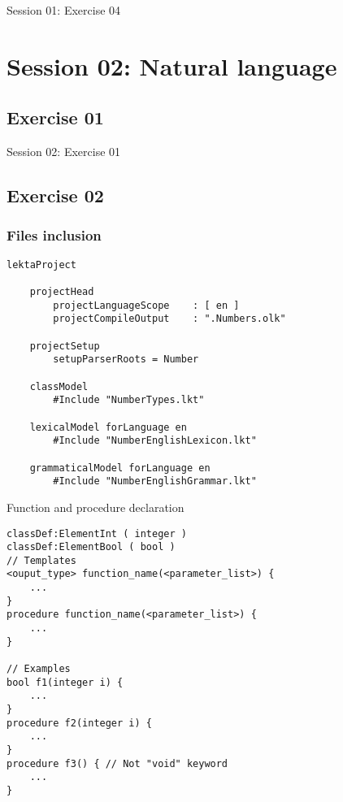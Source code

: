 \documentclass[11pt]{beamer}
\begin{document}
\begin{frame}[fragile]
\Huge
\begin{center}
Session 01: Exercise 04
\end{center}
\end{frame}

\section{Session 02: Natural language}

\subsection{Exercise 01}

\begin{frame}[fragile]
\Huge
\begin{center}
Session 02: Exercise 01
\end{center}
\end{frame}

\subsection{Exercise 02}

\begin{frame}[fragile]
\frametitle{Files inclusion}
\footnotesize
\begin{lstlisting}[language=lekta]
lektaProject
	
	projectHead
		projectLanguageScope	: [ en ]
		projectCompileOutput	: ".Numbers.olk"

	projectSetup
		setupParserRoots = Number

	classModel
		#Include "NumberTypes.lkt"

	lexicalModel forLanguage en
		#Include "NumberEnglishLexicon.lkt"

	grammaticalModel forLanguage en
		#Include "NumberEnglishGrammar.lkt"
\end{lstlisting}
\end{frame}

\begin{frame}[fragile]
\begin{block}{Function and procedure declaration}
\scriptsize
\begin{lstlisting}[language=lekta]
classDef:ElementInt ( integer )
classDef:ElementBool ( bool )
// Templates
<ouput_type> function_name(<parameter_list>) {
	...
}
procedure function_name(<parameter_list>) {
	...
}

// Examples
bool f1(integer i) {
	...
}
procedure f2(integer i) {
	...
}
procedure f3() { // Not "void" keyword
	...
}
\end{lstlisting}
\end{block}
\end{frame}
\end{document}
